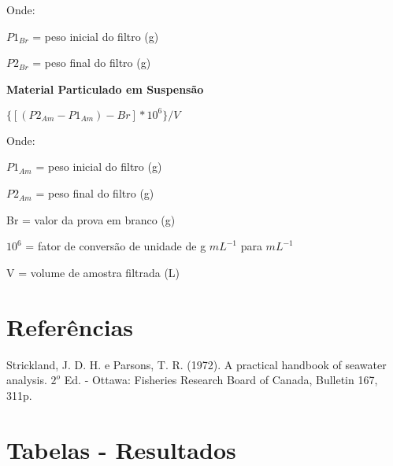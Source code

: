 \documentclass[a4paper,10pt]{SelfArx}
\begin{document}
Onde:

$P1_{Br}$ = peso inicial do filtro (g)

$P2_{Br}$ = peso final do filtro (g)

\vspace{0.20cm}

\textbf {Material Particulado em Suspensão}

\vspace{0.15cm}

\begin{center}
$\{[(P2_{Am}-P1_{Am}) - Br] * 10^6\}/V$
\end{center}
\vspace{0.15cm}
 
Onde:

$P1_{Am}$ = peso inicial do filtro (g)

$P2_{Am}$ = peso final do filtro (g)

Br = valor da prova em branco (g)

$10^6$ = fator de conversão de unidade de g $mL^{-1}$ para $mL^{-1}$

V = volume de amostra filtrada (L)

\vspace{0.2cm}

\section{Referências}
Strickland, J. D. H. e Parsons, T. R. (1972). A practical handbook of seawater analysis. $2^o$ Ed. - Ottawa: Fisheries Research Board of Canada, Bulletin 167, 311p.

% 

\section{Tabelas - Resultados}
\end{document}
